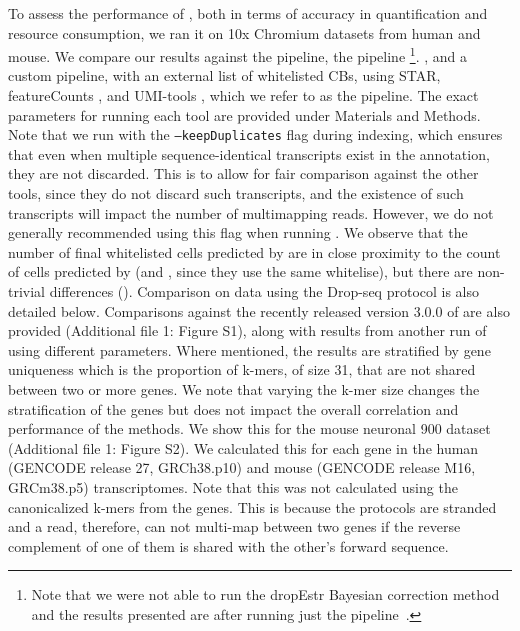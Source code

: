 To assess the performance of \alevin, both in terms of accuracy in quantification and resource consumption, we ran it on 10x Chromium datasets from human and mouse. We compare our results against the \cellr pipeline\citep{tenx}, the \dropest pipeline\citep{dropest} \footnote{Note that we were not able to run the dropEstr Bayesian correction method and the results presented are after running just the \dropest pipeline~\cite{dropseqsrc}.}. , and a custom pipeline, with an external list of whitelisted CBs, using STAR\citep{star}, featureCounts \citep{featurecounts}, and UMI-tools \citep{umitools}, which we refer to as the \naive pipeline. The exact parameters for running each tool are provided under Materials and Methods. Note that we run \alevin with the \texttt{{--}keepDuplicates} flag during indexing, which ensures that even when multiple sequence-identical transcripts exist in the annotation, they are not discarded. This is to allow for fair comparison against the other tools, since they do not discard such transcripts, and the existence of such transcripts will impact the number of multimapping reads. However, we do not generally recommended using this flag when running \alevin. We observe that the number of final whitelisted cells predicted by \alevin are in close proximity to the count of cells predicted by \cellr (and \dropest, since they use the same whitelise), but there are non-trivial differences (). Comparison on data using the Drop-seq\citep{dropseq} protocol is also detailed below. Comparisons against the recently released version 3.0.0 of \cellr are also provided (Additional file 1: Figure S1), along with results from another run of \alevin using different parameters. Where mentioned, the results are stratified by gene uniqueness which is the proportion of k-mers, of size 31, that are not shared between two or more genes. We note that varying the k-mer size changes the stratification of the genes but does not impact the overall correlation and performance of the methods. We show this for the mouse neuronal 900 dataset (Additional file 1: Figure S2). We calculated this for each gene in the human (GENCODE release 27, GRCh38.p10) and mouse (GENCODE release M16, GRCm38.p5) transcriptomes. Note that this was not calculated using the canonicalized k-mers from the genes. This is because the \scrnaseq protocols are stranded and a read, therefore, can not multi-map between two genes if the reverse complement of one of them is shared with the other's forward sequence. 

